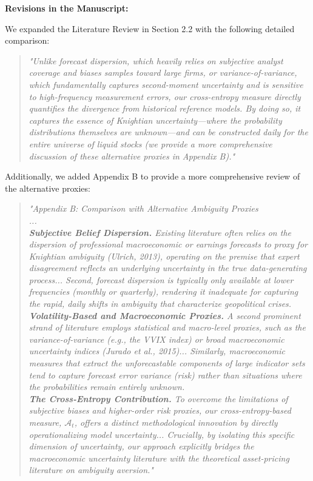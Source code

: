 \documentclass[12pt]{article}
\begin{document}
\begin{highlightbox}
\textbf{Revisions in the Manuscript:}

We expanded the Literature Review in Section 2.2 with the following detailed comparison:
\vspace{0.2cm}
\begin{quote}
\color{red}\itshape "Unlike forecast dispersion, which heavily relies on subjective analyst coverage and biases samples toward large firms, or variance-of-variance, which fundamentally captures second-moment uncertainty and is sensitive to high-frequency measurement errors, our cross-entropy measure directly quantifies the divergence from historical reference models. By doing so, it captures the essence of Knightian uncertainty---where the probability distributions themselves are unknown---and can be constructed daily for the entire universe of liquid stocks (we provide a more comprehensive discussion of these alternative proxies in Appendix B)."
\end{quote}

Additionally, we added Appendix B to provide a more comprehensive review of the alternative proxies:
\vspace{0.2cm}
\begin{quote}
\color{red}\itshape "Appendix B: Comparison with Alternative Ambiguity Proxies \\
... \\
\textbf{Subjective Belief Dispersion.} Existing literature often relies on the dispersion of professional macroeconomic or earnings forecasts to proxy for Knightian ambiguity (Ulrich, 2013), operating on the premise that expert disagreement reflects an underlying uncertainty in the true data-generating process... Second, forecast dispersion is typically only available at lower frequencies (monthly or quarterly), rendering it inadequate for capturing the rapid, daily shifts in ambiguity that characterize geopolitical crises. \\
\textbf{Volatility-Based and Macroeconomic Proxies.} A second prominent strand of literature employs statistical and macro-level proxies, such as the variance-of-variance (e.g., the VVIX index) or broad macroeconomic uncertainty indices (Jurado et al., 2015)... Similarly, macroeconomic measures that extract the unforecastable components of large indicator sets tend to capture forecast error variance (risk) rather than situations where the probabilities remain entirely unknown. \\
\textbf{The Cross-Entropy Contribution.} To overcome the limitations of subjective biases and higher-order risk proxies, our cross-entropy-based measure, $\mathcal{A}_t$, offers a distinct methodological innovation by directly operationalizing model uncertainty... Crucially, by isolating this specific dimension of uncertainty, our approach explicitly bridges the macroeconomic uncertainty literature with the theoretical asset-pricing literature on ambiguity aversion."

\end{quote}
\end{highlightbox}
\end{document}
